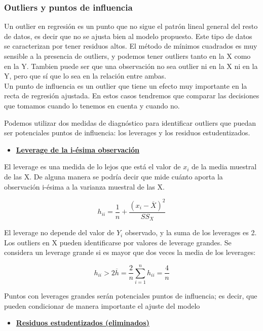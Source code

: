 \subsubsection{Outliers y puntos de influencia}

Un outlier en regresión es un punto que no sigue el patrón lineal general del resto de datos, es decir que no se ajusta bien al modelo propuesto. Este tipo de datos se caracterizan por tener residuos altos.
El método de mínimos cuadrados es muy sensible a la presencia de outliers, y podemos tener outliers tanto en la X como en la Y. Tambien puede ser que una observación no sea outlier ni en la X ni en la Y, pero que sí que lo sea en la relación entre ambas.\\
Un punto de influencia es un outlier que tiene un efecto muy importante en la recta de regresión ajustada. En estos casos tendremos que comparar las decisiones que tomamos cuando lo tenemos en cuenta y cuando no.

Podemos utilizar dos medidas de diagnóstico para identificar outliers que puedan ser potenciales puntos de influencia: los leverages y los residuos estudentizados.

\begin{itemize}
    \item \underline{\textbf{Leverage de la i-ésima observación}}
\end{itemize}

El leverage es una medida de lo lejos que está el valor de $x_i$ de la media muestral de las X. De alguna manera se podría decir que mide cuánto aporta la observación i-ésima a la varianza muestral de las X.

$$
h_{ii}=\frac{1}{n}+\frac{(x_i-\overline{X})^2}{SS_X}
$$

El leverage no depende del valor de $Y_i$ observado, y la suma de los leverages es 2. Los outliers en X pueden identificarse por valores de leverage grandes. Se considera un leverage grande si es mayor que dos veces la media de los leverages:

$$
h_{ii}>2\overline{h}=\frac{2}{n}\sum_{i=1}^{n}h_{ii}=\frac{4}{n}
$$

Puntos con leverages grandes serán potenciales puntos de influencia; es decir, que pueden condicionar de manera importante el ajuste del modelo

\begin{itemize}
    \item \underline{\textbf{Residuos estudentizados (eliminados)}}
\end{itemize}

